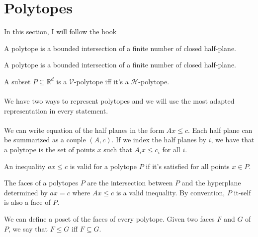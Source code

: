 \section{Polytopes}

In this section, I will follow the book \cite{polytopes}

\begin{definition}
  A polytope is a bounded intersection of a finite number of closed half-plane.
\end{definition}

\begin{definition}
  A polytope is a bounded intersection of a finite number of closed half-plane.
\end{definition}

\begin{theorem}
  A subset $P \subseteq \mathbb R^d$ is a $\mathcal V$-polytope iff it's a $\mathcal H$-polytope.
\end{theorem}

\paragraph{}
We have two ways to represent polytopes and we will use the most adapted representation in every statement.

\paragraph{}
We can write equation of the half planes in the form $Ax \le c$. Each half plane can be summarized as a couple $(A,c)$. If we index the half planes by $i$, we have that a polytope is the set of points $x$ such that $A_i x \le c_i$ for all $i$.

\begin{definition}
  An inequality $ax \le c$ is valid for a polytope $P$ if it's satisfied for all points $x \in P$.
\end{definition}

\begin{definition}
  The faces of a polytopes $P$ are the intersection between $P$ and the hyperplane determined by $ax = c$ where $Ax \le c$ is a valid inequality. By convention, $P$ it-self is also a face of $P$.
\end{definition}

\begin{definition}
  We can define a poset of the faces of every polytope. Given two faces $F$ and $G$ of $P$, we say that $F \le G$ iff $F \subseteq G$.
\end{definition}

